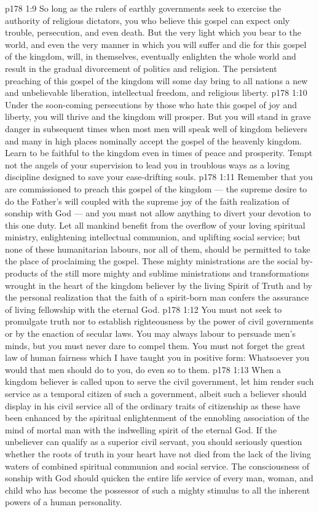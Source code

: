 \vs p178 1:9 So long as the rulers of earthly governments seek to exercise the authority of religious dictators, you who believe this gospel can expect only trouble, persecution, and even death. But the very light which you bear to the world, and even the very manner in which you will suffer and die for this gospel of the kingdom, will, in themselves, eventually enlighten the whole world and result in the gradual divorcement of politics and religion. The persistent preaching of this gospel of the kingdom will some day bring to all nations a new and unbelievable liberation, intellectual freedom, and religious liberty.
\vs p178 1:10 Under the soon\hyp{}coming persecutions by those who hate this gospel of joy and liberty, you will thrive and the kingdom will prosper. But you will stand in grave danger in subsequent times when most men will speak well of kingdom believers and many in high places nominally accept the gospel of the heavenly kingdom. Learn to be faithful to the kingdom even in times of peace and prosperity. Tempt not the angels of your supervision to lead you in troublous ways as a loving discipline designed to save your ease\hyp{}drifting souls.
\vs p178 1:11 Remember that you are commissioned to preach this gospel of the kingdom --- the supreme desire to do the Father’s will coupled with the supreme joy of the faith realization of sonship with God --- and you must not allow anything to divert your devotion to this one duty. Let all mankind benefit from the overflow of your loving spiritual ministry, enlightening intellectual communion, and uplifting social service; but none of these humanitarian labours, nor all of them, should be permitted to take the place of proclaiming the gospel. These mighty ministrations are the social by\hyp{}products of the still more mighty and sublime ministrations and transformations wrought in the heart of the kingdom believer by the living Spirit of Truth and by the personal realization that the faith of a spirit\hyp{}born man confers the assurance of living fellowship with the eternal God.
\vs p178 1:12 You must not seek to promulgate truth nor to establish righteousness by the power of civil governments or by the enaction of secular laws. You may always labour to persuade men’s minds, but you must never dare to compel them. You must not forget the great law of human fairness which I have taught you in positive form: Whatsoever you would that men should do to you, do even so to them.
\vs p178 1:13 When a kingdom believer is called upon to serve the civil government, let him render such service as a temporal citizen of such a government, albeit such a believer should display in his civil service all of the ordinary traits of citizenship as these have been enhanced by the spiritual enlightenment of the ennobling association of the mind of mortal man with the indwelling spirit of the eternal God. If the unbeliever can qualify as a superior civil servant, you should seriously question whether the roots of truth in your heart have not died from the lack of the living waters of combined spiritual communion and social service. The consciousness of sonship with God should quicken the entire life service of every man, woman, and child who has become the possessor of such a mighty stimulus to all the inherent powers of a human personality.
